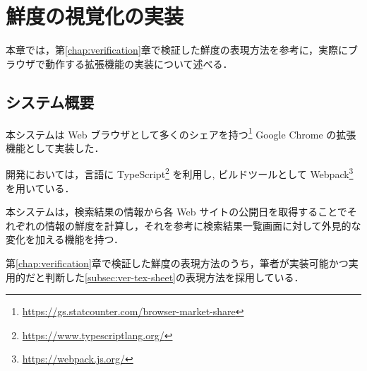 \chapter{鮮度の視覚化の実装}
\label{chap:implementation}

本章では，第\ref{chap:verification}章で検証した鮮度の表現方法を参考に，実際にブラウザで動作する拡張機能の実装について述べる．

\newpage

\section{システム概要}
\label{sec:imp_system}

本システムは Web ブラウザとして多くのシェアを持つ\footnote{\url{https://gs.statcounter.com/browser-market-share}} Google Chrome の拡張機能として実装した．

開発においては，言語に TypeScript\footnote{\url{https://www.typescriptlang.org/}} を利用し, ビルドツールとして Webpack\footnote{\url{https://webpack.js.org/}} を用いている．

本システムは，検索結果の情報から各 Web サイトの公開日を取得することでそれぞれの情報の鮮度を計算し，それを参考に検索結果一覧画面に対して外見的な変化を加える機能を持つ．

第\ref{chap:verification}章で検証した鮮度の表現方法のうち，筆者が実装可能かつ実用的だと判断した\ref{subsec:ver-tex-sheet}の表現方法を採用している．

